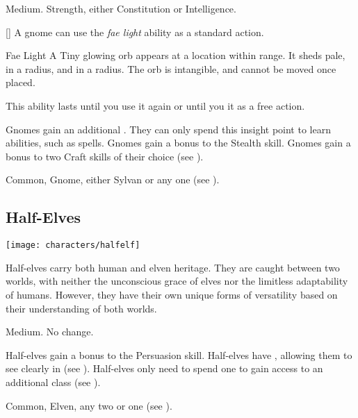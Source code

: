          Medium.
          Strength, either  Constitution or  Intelligence.
        \begin{raggeditemize}
            [\sparkle] A gnome can use the \textit{fae light} ability as a standard action.
                \begin{activeability}{Fae Light}
                    \rankline
                    A Tiny glowing orb appears at a location within \rngmed range.
                    It sheds pale,  in a \areasmall radius, and  in a \areamed radius.
                    The orb is intangible, and cannot be moved once placed.

                    This ability lasts until you use it again or until you  it as a free action.
                \end{activeability}
             Gnomes gain an additional .
                They can only spend this insight point to learn \magical abilities, such as spells.
             Gnomes gain a  bonus to the Stealth skill.
             Gnomes gain a  bonus to two Craft skills of their choice (see ).
        \end{raggeditemize}
         Common, Gnome, either Sylvan or any one  (see ).

    \subsection{Half-Elves}\label{Half-Elves}
        \texttt{[image: characters/halfelf]}

        Half-elves carry both human and elven heritage.
        They are caught between two worlds, with neither the unconscious grace of elves nor the limitless adaptability of humans.
        However, they have their own unique forms of versatility based on their understanding of both worlds.

         Medium.
         No change.
        \begin{raggeditemize}
             Half-elves gain a  bonus to the Persuasion skill.
             Half-elves have , allowing them to see clearly in  (see ).
             Half-elves only need to spend one  to gain access to an additional class (see ).
        \end{raggeditemize}
         Common, Elven, any two  or one  (see ).

